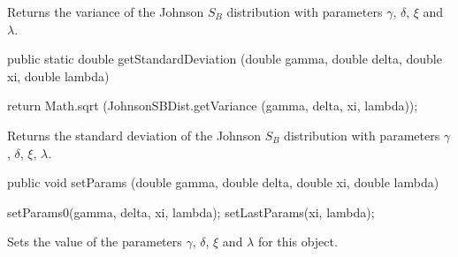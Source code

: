 \begin{tabb}  Returns the variance 
   of the Johnson $S_B$ distribution with parameters $\gamma$, $\delta$, $\xi$
   and $\lambda$.
\end{tabb}
\begin{htmlonly}
\end{htmlonly}
\begin{code}

  public static double getStandardDeviation (double gamma, double delta,
                                             double xi, double lambda)\begin{hide} {
      return Math.sqrt (JohnsonSBDist.getVariance (gamma, delta, xi, lambda));
   }\end{hide}
\end{code}
\begin{tabb}  Returns the standard deviation of the Johnson $S_B$
   distribution with parameters $\gamma$, $\delta$, $\xi$, $\lambda$.
\end{tabb}
\begin{htmlonly}
\end{htmlonly}
\begin{code}

   public void setParams (double gamma, double delta,
                          double xi, double lambda)\begin{hide} {
      setParams0(gamma, delta, xi, lambda);
      setLastParams(xi, lambda);
   }\end{hide}
\end{code}
  \begin{tabb}
  Sets the value of the parameters $\gamma$, $\delta$, $\xi$ and
  $\lambda$ for this object.
 \end{tabb}
\begin{code}\begin{hide}
}\end{hide}
\end{code}
